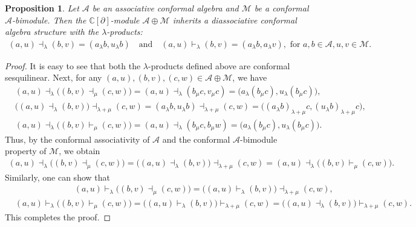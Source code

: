 \documentclass[a4paper,reqno,10pt]{amsart}
\theoremstyle{plain}
\newtheorem{proposition}[thm]{Proposition}
\theoremstyle{definition}
\theoremstyle{remark}
\newcommand{\C}{\mathbb{C}}
\newcommand{\M}{\mathcal{M}}
\newcommand{\p}{\partial}
\newcommand{\la}{\lambda}
\begin{document}
\begin{proposition}\label{new-diass}
    Let $\mathcal{A}$ be an associative conformal algebra and $\M$ be a conformal $\mathcal{A}$-bimodule. Then the $\C[\p]$-module $\mathcal{A} \oplus \M$ inherits a diassociative conformal algebra structure with the $\la$-products:
     \begin{align*}
         (a,u)\dashv_{\la}(b,v) = (a_{\la}b, u_{\la}b) ~~~ \text{ and } ~~~ (a,u)\vdash_{\la}(b,v) = (a_{\la}b, a_{\la}v), \text{ for } a,b\in \mathcal{A}, u,v \in \M.
     \end{align*}
\end{proposition}
\begin{proof}
    It is easy to see that both the $\la$-products defined above are conformal sesquilinear. Next, for any $(a, u),(b, v),(c, w) \in \mathcal{A} \oplus \M$, we have
    \begin{align*}     
 & (a, u) \dashv_{\la} \big ( (b, v)  \dashv_{\mu} (c, w) \big)= (a,u) \dashv_{\la} (b_{\mu}c, v_{\mu}c)=\big( a_{\la}(b_{\mu}c), u_{\la}(b_{\mu}c) \big),\\&
\big( (a, u) \dashv_{\la}  (b, v)  \big ) \dashv_{\la + \mu} (c, w) = (a_{\la}b,u_{\la}b) \dashv_{\la + \mu} (c, w)=\big( (a_{\la}b)_{\la+\mu}c, (u_{\la}b)_{\la+\mu}c \big),\\&
 (a, u) \dashv_{\la} \big ( (b, v)  \vdash_{\mu} (c, w) \big)= (a,u) \dashv_{\la} (b_{\mu}c, b_{\mu}w)=\big( a_{\la}(b_{\mu}c), u_{\la}(b_{\mu}c) \big).
    \end{align*}
    Thus, by the conformal associativity of $\mathcal{A}$ and the conformal $\mathcal{A}$-bimodule property of $\M$, we obtain
    \begin{align*}
        (a, u) \dashv_{\la} \big ( (b, v)  \dashv_{\mu} (c, w) \big)=\big( (a, u) \dashv_{\la}  (b, v)  \big ) \dashv_{\la + \mu} (c, w) =(a, u) \dashv_{\la} \big ( (b, v)  \vdash_{\mu} (c, w) \big).
    \end{align*}
    Similarly, one can show that
    \begin{align*}
    & \qquad \qquad  \qquad \quad (a, u) \vdash_{\la} \big ( (b, v)  \dashv_{\mu} (c, w) \big)=\big( (a, u) \vdash_{\la}  (b, v)  \big ) \dashv_{\la + \mu} (c, w),\\&
         (a, u) \vdash_{\la} \big ( (b, v)  \vdash_{\mu} (c, w) \big)=\big( (a, u) \vdash_{\la}  (b, v)  \big ) \vdash_{\la + \mu} (c, w) =\big( (a, u) \dashv_{\la}  (b, v)  \big ) \vdash_{\la + \mu} (c, w).
    \end{align*}
    This completes the proof.
\end{proof}
\end{document}
